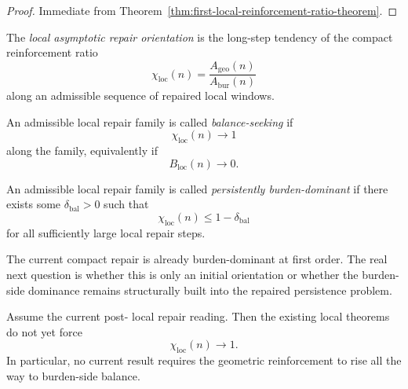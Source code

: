 \begin{proof}
Immediate from Theorem~\ref{thm:first-local-reinforcement-ratio-theorem}.
\end{proof}


\begin{definition}
\label{def:local-asymptotic-repair-orientation}
The \emph{local asymptotic repair orientation} is the long-step tendency of the compact reinforcement ratio
\[
 \chi_{\mathrm{loc}}(n)
 =
 \frac{A_{\mathrm{geo}}(n)}{A_{\mathrm{bur}}(n)}
\]
along an admissible sequence of repaired local windows.
\end{definition}

\begin{definition}
\label{def:balance-seeking-local-repair-family}
An admissible local repair family is called \emph{balance-seeking} if
\[
 \chi_{\mathrm{loc}}(n)\to 1
\]
along the family, equivalently if
\[
 B_{\mathrm{loc}}(n)\to 0.
\]
\end{definition}

\begin{definition}
\label{def:persistently-burden-dominant-local-repair-family}
An admissible local repair family is called \emph{persistently burden-dominant} if there exists some \(\delta_{\mathrm{bal}}>0\) such that
\[
 \chi_{\mathrm{loc}}(n)\le 1-\delta_{\mathrm{bal}}
\]
for all sufficiently large local repair steps.
\end{definition}

\begin{remark}
\label{rem:why-the-asymptotic-question-matters}
The current compact repair is already burden-dominant at first order.
The real next question is whether this is only an initial orientation or whether the burden-side dominance remains structurally built into the repaired persistence problem.
\end{remark}

\begin{proposition}
\label{prop:current-line-does-not-yet-force-balance-seeking-behavior}
Assume the current post- local repair reading.
Then the existing local theorems do not yet force
\[
 \chi_{\mathrm{loc}}(n)\to 1.
\]
In particular, no current result requires the geometric reinforcement to rise all the way to burden-side balance.
\end{proposition}

